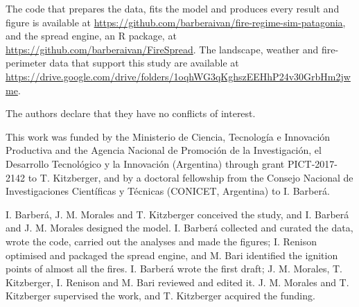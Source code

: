 \documentclass[ResearchPaper,linenum]{CSIRO_LaTeX_Template}
\begin{document}
\begin{framedbox}

The code that prepares the data, fits the model and produces every result and figure is
available at \url{https://github.com/barberaivan/fire-regime-sim-patagonia}, and the spread
engine, an R package, at \url{https://github.com/barberaivan/FireSpread}. The landscape,
weather and fire-perimeter data that support this study are available at
\url{https://drive.google.com/drive/folders/1oqhWG3qKghszEEHhP24v30GrbHm2jwme}.

The authors declare that they have no conflicts of interest.

This work was funded by the Ministerio de Ciencia, Tecnología e Innovación Productiva and
the Agencia Nacional de Promoción de la Investigación, el Desarrollo Tecnológico y la
Innovación (Argentina) through grant PICT-2017-2142 to T. Kitzberger, and by a doctoral
fellowship from the Consejo Nacional de Investigaciones Científicas y Técnicas (CONICET,
Argentina) to I. Barberá.

I. Barberá, J. M. Morales and T. Kitzberger conceived the study, and I. Barberá and
J. M. Morales designed the model. I. Barberá collected and curated the data, wrote the
code, carried out the analyses and made the figures; I. Renison optimised and packaged
the spread engine, and M. Bari identified the ignition points of almost all the fires.
I. Barberá wrote the first draft; J. M. Morales, T. Kitzberger, I. Renison and M. Bari
reviewed and edited it. J. M. Morales and T. Kitzberger supervised the work, and
T. Kitzberger acquired the funding.


\end{framedbox}
\end{document}
